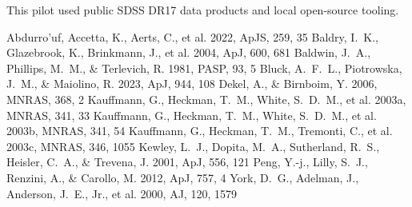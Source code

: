 \documentclass[twocolumn]{aastex631}
\begin{document}
\acknowledgments
This pilot used public SDSS DR17 data products and local open-source tooling.

\begin{thebibliography}{}
 Abdurro'uf, Accetta, K., Aerts, C., et al. 2022, ApJS, 259, 35
 Baldry, I.~K., Glazebrook, K., Brinkmann, J., et al. 2004, ApJ, 600, 681
 Baldwin, J.~A., Phillips, M.~M., \& Terlevich, R. 1981, PASP, 93, 5
 Bluck, A.~F.~L., Piotrowska, J.~M., \& Maiolino, R. 2023, ApJ, 944, 108
 Dekel, A., \& Birnboim, Y. 2006, MNRAS, 368, 2
 Kauffmann, G., Heckman, T.~M., White, S.~D.~M., et al. 2003a, MNRAS, 341, 33
 Kauffmann, G., Heckman, T.~M., White, S.~D.~M., et al. 2003b, MNRAS, 341, 54
 Kauffmann, G., Heckman, T.~M., Tremonti, C., et al. 2003c, MNRAS, 346, 1055
 Kewley, L.~J., Dopita, M.~A., Sutherland, R.~S., Heisler, C.~A., \& Trevena, J. 2001, ApJ, 556, 121
 Peng, Y.-j., Lilly, S.~J., Renzini, A., \& Carollo, M. 2012, ApJ, 757, 4
 York, D.~G., Adelman, J., Anderson, J.~E., Jr., et al. 2000, AJ, 120, 1579
\end{thebibliography}
\end{document}
